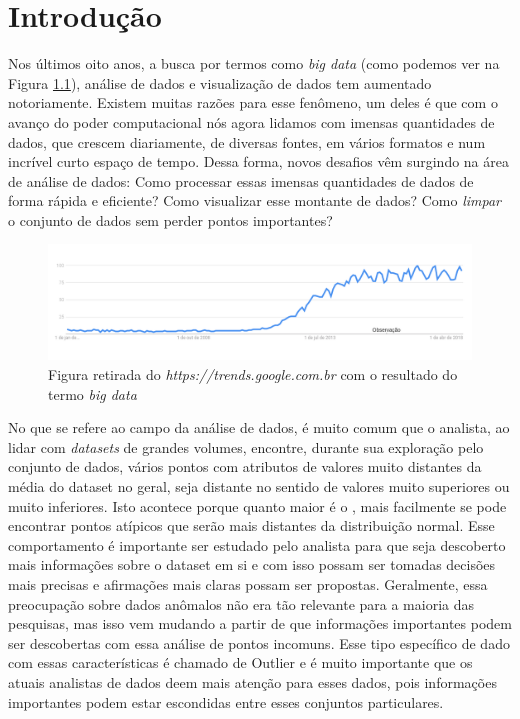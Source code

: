 \chapter{Introdução}

Nos últimos oito anos, a busca por termos como \textit{big data} (como podemos ver na Figura \ref{fig:google-trend}), análise de dados e visualização de dados tem aumentado notoriamente. Existem muitas razões para esse fenômeno, um deles é que com o avanço do poder computacional nós agora lidamos com imensas quantidades de dados, que crescem diariamente, de diversas fontes, em vários formatos e num incrível curto espaço de tempo. Dessa forma, novos desafios vêm surgindo na área de análise de dados: Como processar essas imensas quantidades de dados de forma rápida e eficiente? Como visualizar esse montante de dados? Como \textit{limpar} o conjunto de dados sem perder pontos importantes?

\begin{figure}[!h]
	\centering
	\includegraphics[width=\textwidth]{images/google-trend-big-data.png}
	\caption{Figura retirada do \textit{https://trends.google.com.br} com o resultado do termo \textit{big data}}
	\label{fig:google-trend}
	\vspace{-10pt}
\end{figure}

No que se refere ao campo da análise de dados, é muito comum que o analista, ao lidar com \textit{datasets} de grandes volumes, encontre, durante sua exploração pelo conjunto de dados, vários pontos com atributos de valores muito distantes da média do dataset no geral, seja distante no sentido de valores muito superiores ou muito inferiores. Isto acontece porque quanto maior é o , mais facilmente se pode encontrar pontos atípicos que serão mais distantes da distribuição normal. Esse comportamento é importante ser estudado pelo analista para que seja descoberto mais informações sobre o dataset em si e com isso possam ser tomadas decisões mais precisas e afirmações mais claras possam ser propostas. Geralmente, essa preocupação sobre dados anômalos não era tão relevante para a maioria das pesquisas, mas isso vem mudando a partir de que informações importantes podem ser descobertas com essa análise de pontos incomuns. Esse tipo específico de dado com essas características é chamado de Outlier e é muito importante que os atuais analistas de dados deem mais atenção para esses dados, pois informações importantes podem estar escondidas entre esses conjuntos particulares.

